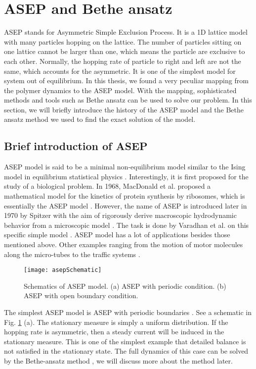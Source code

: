 \section{ASEP and Bethe ansatz}
\label{sec:asep_and_bethe_ansatz}
ASEP stands for Asymmetric Simple Exclusion Process. It is a 1D lattice model with many particles hopping on the lattice. The number of particles sitting on one lattice cannot be larger than one, which means the particle are exclusive to each other. Normally, the hopping rate of particle to right and left are not the same, which accounts for the asymmetric. It is one of the simplest model for system out of equilibrium. In this thesis, we found a very peculiar mapping from the polymer dynamics to the ASEP model. With the mapping, sophisticated methods and tools such as Bethe ansatz can be used to solve our problem. In this section, we will briefly introduce the history of the ASEP model and the Bethe ansatz method we used to find the exact solution of the model. 

\subsection{Brief introduction of ASEP}
\label{sub:brief_introduction_of_asep}

ASEP model is said to be a minimal non-equilibrium model similar to the Ising model in equilibrium statistical physics \cite{Derrida1998, Mallick2011b}. Interestingly, it is first proposed for the study of a biological problem. In 1968, MacDonald et al. proposed a mathematical model for the kinetics of protein synthesis by ribosomes, which is essentially the ASEP model \cite{Macdonald1968}. However, the name of ASEP is introduced later in 1970 by Spitzer with the aim of rigorously derive macroscopic hydrodynamic behavior from a microscopic model \cite{Spitzer1970}. The task is done by Varadhan et al. on this specific simple model \cite{hsu1999}. ASEP model has a lot of applications besides those mentioned above. Other examples ranging from the motion of motor molecules along the micro-tubes to the traffic systems \cite{Bressloff2013, schadschneider2010}. 

\begin{figure}[htpb]
    \centering
    \texttt{[image: asepSchematic]}
    \caption{Schematics of ASEP model. (a) ASEP with periodic condition. (b) ASEP with open boundary condition.}
    \label{fig:asepSchematic}
\end{figure}

The simplest ASEP model is ASEP with periodic boundaries \cite{Mallick2011b}. See a schematic in Fig. \ref{fig:asepSchematic} (a). The stationary measure is simply a uniform distribution. If the hopping rate is asymmetric, then a steady current will be induced in the stationary measure. This is one of the simplest example that detailed balance is not satisfied in the stationary state. The full dynamics of this case can be solved by the Bethe-ansatz method \cite{Batchelor2007}, we will discuss more about the method later. 

